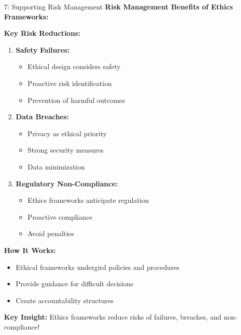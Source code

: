 \documentclass[8pt]{beamer}
\begin{document}
	\begin{frame}{7: Supporting Risk Management}
		\fontsize{6.5}{7.5}\selectfont
		\textbf{Risk Management Benefits of Ethics Frameworks:}
		
		\vspace{0.1cm}
		\textbf{Key Risk Reductions:}
		\begin{enumerate}
			\item \textbf{Safety Failures:}
			\begin{itemize}
				\item Ethical design considers safety
				\item Proactive risk identification
				\item Prevention of harmful outcomes
			\end{itemize}
			\item \textbf{Data Breaches:}
			\begin{itemize}
				\item Privacy as ethical priority
				\item Strong security measures
				\item Data minimization
			\end{itemize}
			\item \textbf{Regulatory Non-Compliance:}
			\begin{itemize}
				\item Ethics frameworks anticipate regulation
				\item Proactive compliance
				\item Avoid penalties
			\end{itemize}
		\end{enumerate}
		
		\vspace{0.1cm}
		\textbf{How It Works:}
		\begin{itemize}
			\item Ethical frameworks undergird policies and procedures
			\item Provide guidance for difficult decisions
			\item Create accountability structures
		\end{itemize}
		
		\textcolor{myblue}{\textbf{Key Insight:}} Ethics frameworks \textcolor{myblue}{reduce risks} of failures, breaches, and non-compliance!
	\end{frame}
	
\end{document}

